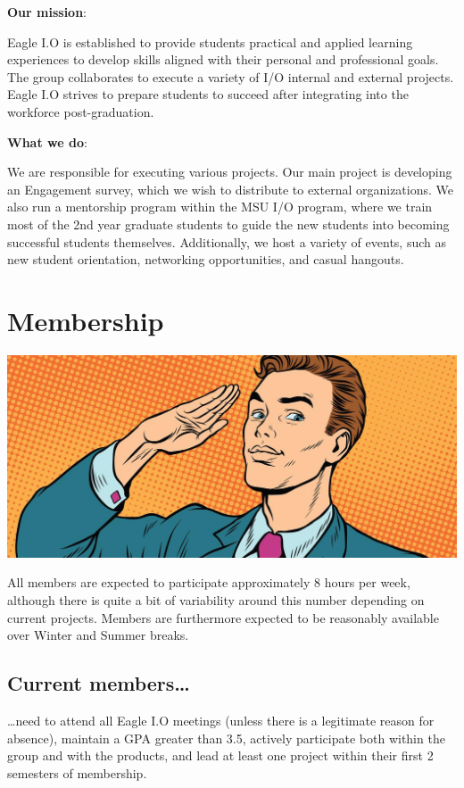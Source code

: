\documentclass[
]{book}
\begin{document}
\textbf{Our mission}:

Eagle I.O is established to provide students practical and applied learning experiences to develop skills aligned with their personal and professional goals. The group collaborates to execute a variety of I/O internal and external projects. Eagle I.O strives to prepare students to succeed after integrating into the workforce post-graduation.

\textbf{What we do}:

We are responsible for executing various projects. Our main project is developing an Engagement survey, which we wish to distribute to external organizations. We also run a mentorship program within the MSU I/O program, where we train most of the 2nd year graduate students to guide the new students into becoming successful students themselves. Additionally, we host a variety of events, such as new student orientation, networking opportunities, and casual hangouts.

\hypertarget{duties}{%
\chapter{Membership}\label{duties}}

\includegraphics{images/duty.jpg}

All members are expected to participate approximately 8 hours per week, although there is quite a bit of variability around this number depending on current projects. Members are furthermore expected to be reasonably available over Winter and Summer breaks.

\hypertarget{current-members}{%
\section{Current members\ldots{}}\label{current-members}}

\ldots need to attend all Eagle I.O meetings (unless there is a legitimate reason for absence), maintain a GPA greater than 3.5, actively participate both within the group and with the products, and lead at least one project within their first 2 semesters of membership.
\end{document}
